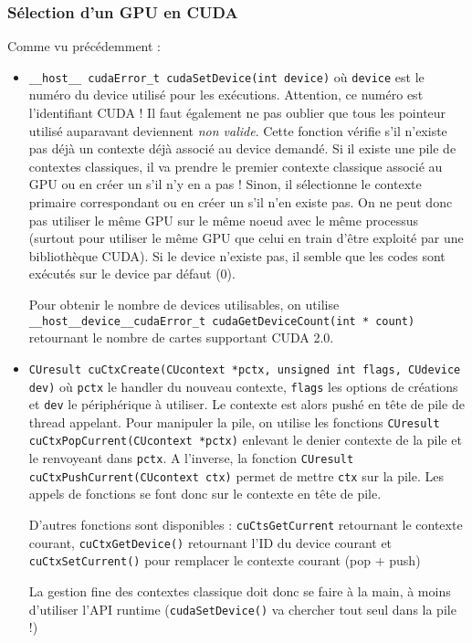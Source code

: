 \documentclass{article}
\begin{document}
\subsubsection{Sélection d'un GPU en CUDA}
Comme vu précédemment :
\begin{itemize}
\item \texttt{\_\_host\_\_ cudaError\_t cudaSetDevice(int device)} où \texttt{device} est le numéro du device utilisé pour les exécutions. Attention, ce numéro est l'identifiant CUDA ! Il faut également ne pas oublier que tous les pointeur utilisé auparavant deviennent \emph{non valide}. Cette fonction vérifie s'il n'existe pas déjà un contexte déjà associé au device demandé. Si il existe une pile de contextes classiques, il va prendre le premier contexte classique associé au GPU ou en créer un s'il n'y en a pas ! Sinon, il sélectionne le contexte primaire correspondant ou en créer un s'il n'en existe pas. On ne peut donc pas utiliser le même GPU sur le même noeud avec le même processus (surtout pour utiliser le même GPU que celui en train d'être exploité par une bibliothèque CUDA). Si le device n'existe pas, il semble que les codes sont exécutés sur le device par défaut (0).

Pour obtenir le nombre de devices utilisables, on utilise
\texttt{\_\_host\_\_device\_\_cudaError\_t cudaGetDeviceCount(int * count)} retournant le nombre de cartes supportant CUDA 2.0.

\item \texttt{CUresult cuCtxCreate(CUcontext *pctx, unsigned int flags, CUdevice dev)} où \texttt{pctx} le handler du nouveau contexte, \texttt{flags} les options de créations et \texttt{dev} le périphérique à utiliser. Le contexte est alors pushé en tête de pile de thread appelant. Pour manipuler la pile, on utilise les fonctions \texttt{CUresult cuCtxPopCurrent(CUcontext *pctx)} enlevant le denier contexte de la pile et le renvoyeant dans \texttt{pctx}. A l'inverse, la fonction \texttt{CUresult cuCtxPushCurrent(CUcontext ctx)} permet de mettre \texttt{ctx} sur la pile. Les appels de fonctions se font donc sur le contexte en tête de pile.

D'autres fonctions sont disponibles : \texttt{cuCtsGetCurrent} retournant le contexte courant, \texttt{cuCtxGetDevice()} retournant l'ID du device courant et \texttt{cuCtxSetCurrent()} pour remplacer le contexte courant (pop + push)

La gestion fine des contextes classique doit donc  se faire à la main, à moins d'utiliser l'API runtime (\texttt{cudaSetDevice()} va chercher tout seul dans la pile !) 
\end{itemize}
\end{document}
